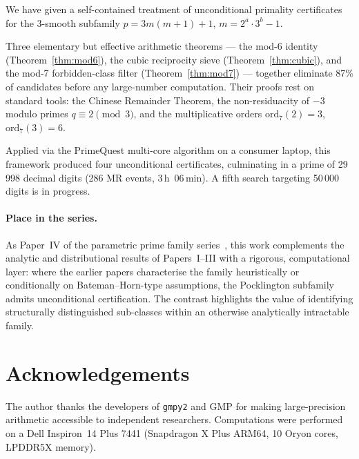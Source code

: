 \documentclass[11pt,a4paper]{article}
\theoremstyle{plain}
\theoremstyle{definition}
\begin{document}
We have given a self-contained treatment of unconditional primality
certificates for the 3-smooth subfamily $p = 3m(m+1) + 1$,
$m = 2^a \cdot 3^b - 1$.

Three elementary but effective arithmetic theorems --- the mod-6 identity
(Theorem~\ref{thm:mod6}), the cubic reciprocity sieve
(Theorem~\ref{thm:cubic}), and the mod-7 forbidden-class filter
(Theorem~\ref{thm:mod7}) --- together eliminate 87\% of candidates before
any large-number computation. Their proofs rest on standard tools: the
Chinese Remainder Theorem, the non-residuacity of $-3$ modulo primes
$q \equiv 2 \pmod{3}$, and the multiplicative orders $\mathrm{ord}_7(2) = 3$,
$\mathrm{ord}_7(3) = 6$.

Applied via the PrimeQuest multi-core algorithm on a consumer laptop, this
framework produced four unconditional certificates, culminating in a prime
of 29\,998 decimal digits (286 MR events, 3\,h~06\,min). A fifth search
targeting 50\,000 digits is in progress.

\paragraph{Place in the series.} As Paper~IV of the parametric prime family
series~\cite{paper1,paper2,paper3}, this work complements the analytic and
distributional results of Papers~I--III with a rigorous, computational layer:
where the earlier papers characterise the family heuristically or
conditionally on Bateman--Horn-type assumptions, the Pocklington subfamily
admits unconditional certification. The contrast highlights the value of
identifying structurally distinguished sub-classes within an otherwise
analytically intractable family.

\section*{Acknowledgements}

The author thanks the developers of \texttt{gmpy2} and GMP for making
large-precision arithmetic accessible to independent researchers.
Computations were performed on a Dell Inspiron~14 Plus 7441 (Snapdragon X Plus
ARM64, 10 Oryon cores, LPDDR5X memory).
\end{document}
